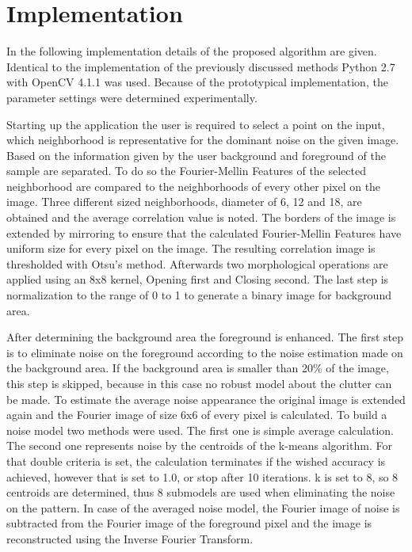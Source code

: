 \documentclass[draft,final]{vutinfth} %
\begin{document}
\section{Implementation}
\par
In the following implementation details of the proposed algorithm are given.
Identical to the implementation of the previously discussed methods Python 2.7 \cite{van1995python} with OpenCV 4.1.1 \cite{opencv_library} was used.
Because of the prototypical implementation, the parameter settings were determined experimentally.
\par
Starting up the application the user is required to select a point on the input, which neighborhood is representative for the dominant noise on the given image.
Based on the information given by the user background and foreground of the sample are separated.
To do so the Fourier-Mellin Features of the selected neighborhood are compared to the neighborhoods of every other pixel on the image.
Three different sized neighborhoods, diameter of 6, 12 and 18, are obtained and the average correlation value is noted.
The borders of the image is extended by mirroring to ensure that the calculated Fourier-Mellin Features have uniform size for every pixel on the image.
The resulting correlation image is thresholded with Otsu's method.
Afterwards two morphological operations are applied using an 8x8 kernel, Opening first and Closing second.
The last step is normalization to the range of 0 to 1 to generate a binary image for background area.
\par
After determining the background area the foreground is enhanced.
The first step is to eliminate noise on the foreground according to the noise estimation made on the background area.
If the background area is smaller than 20\% of the image, this step is skipped, because in this case no robust model about the clutter can be made.
To estimate the average noise appearance the original image is extended again and the Fourier image of size 6x6 of every pixel is calculated.
To build a noise model two methods were used.
The first one is simple average calculation.
The second one represents noise by the centroids of the k-means algorithm.
For that double criteria is set, the calculation terminates if the wished accuracy is achieved, however that is set to 1.0, or stop after 10 iterations.
k is set to 8, so 8 centroids are determined, thus 8 submodels are used when eliminating the noise on the pattern.
In case of the averaged noise model, the Fourier image of noise is subtracted from the Fourier image of the foreground pixel and the image is reconstructed using the Inverse Fourier Transform.
\end{document}
